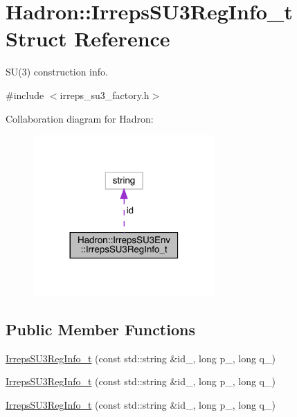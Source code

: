 \hypertarget{structHadron_1_1IrrepsSU3Env_1_1IrrepsSU3RegInfo__t}{}\section{Hadron\+:\+:Irreps\+S\+U3\+Reg\+Info\+\_\+t Struct Reference}
\label{structHadron_1_1IrrepsSU3Env_1_1IrrepsSU3RegInfo__t}


S\+U(3) construction info.  




{\ttfamily \#include $<$irreps\+\_\+su3\+\_\+factory.\+h$>$}



Collaboration diagram for Hadron\+:\nopagebreak
\begin{figure}[H]
\begin{center}
\leavevmode
\includegraphics[width=197pt]{df/d81/structHadron_1_1IrrepsSU3Env_1_1IrrepsSU3RegInfo__t__coll__graph}
\end{center}
\end{figure}
\subsection*{Public Member Functions}
\begin{DoxyCompactItemize}
\item 
\mbox{\hyperlink{structHadron_1_1IrrepsSU3Env_1_1IrrepsSU3RegInfo__t_ad3e33486ad0d29745aea8a67a190d58c}{Irreps\+S\+U3\+Reg\+Info\+\_\+t}} (const std\+::string \&id\+\_\+, long p\+\_\+, long q\+\_\+)
\item 
\mbox{\hyperlink{structHadron_1_1IrrepsSU3Env_1_1IrrepsSU3RegInfo__t_ad3e33486ad0d29745aea8a67a190d58c}{Irreps\+S\+U3\+Reg\+Info\+\_\+t}} (const std\+::string \&id\+\_\+, long p\+\_\+, long q\+\_\+)
\item 
\mbox{\hyperlink{structHadron_1_1IrrepsSU3Env_1_1IrrepsSU3RegInfo__t_ad3e33486ad0d29745aea8a67a190d58c}{Irreps\+S\+U3\+Reg\+Info\+\_\+t}} (const std\+::string \&id\+\_\+, long p\+\_\+, long q\+\_\+)
\end{DoxyCompactItemize}
